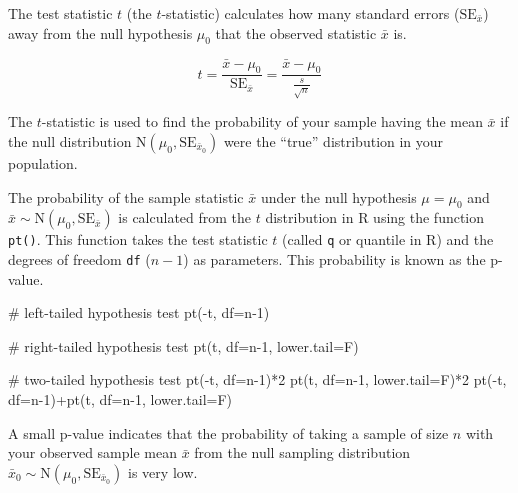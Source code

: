 \documentclass[
  letterpaper,
  DIV=11,
  numbers=noendperiod]{scrartcl}
\newenvironment{Shaded}{\begin{snugshade}}{\end{snugshade}}
\newcommand{\AttributeTok}[1]{\textcolor[rgb]{0.40,0.45,0.13}{#1}}
\newcommand{\CommentTok}[1]{\textcolor[rgb]{0.37,0.37,0.37}{#1}}
\newcommand{\DecValTok}[1]{\textcolor[rgb]{0.68,0.00,0.00}{#1}}
\newcommand{\FunctionTok}[1]{\textcolor[rgb]{0.28,0.35,0.67}{#1}}
\newcommand{\NormalTok}[1]{\textcolor[rgb]{0.00,0.23,0.31}{#1}}
\newcommand{\SpecialCharTok}[1]{\textcolor[rgb]{0.37,0.37,0.37}{#1}}
\begin{document}
The test statistic \(t\) (the \(t\)-statistic) calculates how many
standard errors (\(\text{SE}_{\bar{x}}\)) away from the null hypothesis
\(\mu_0\) that the observed statistic \(\bar{x}\) is.

\[
t=\frac{\bar{x}-\mu_0}{\text{SE}_{\bar{x}}}=\frac{\bar{x}-\mu_0}{\frac{s}{\sqrt{n}}}
\]

The \(t\)-statistic is used to find the probability of your sample
having the mean \(\bar{x}\) if the null distribution
\(\text{N}\left(\mu_0, \text{SE}_{\bar{x}_0}\right)\) were the ``true''
distribution in your population.

The probability of the sample statistic \(\bar{x}\) under the null
hypothesis \(\mu=\mu_0\) and
\(\bar{x} \sim \text{N}\left(\mu_0, \text{SE}_{\bar{x}}\right)\) is
calculated from the \(t\) distribution in R using the function
\texttt{pt()}. This function takes the test statistic \(t\) (called
\texttt{q} or quantile in R) and the degrees of freedom \texttt{df}
(\(n-1\)) as parameters. This probability is known as the p-value.

\begin{Shaded}
\begin{Highlighting}[]
\CommentTok{\# left{-}tailed hypothesis test}
\FunctionTok{pt}\NormalTok{(}\SpecialCharTok{{-}}\NormalTok{t, }\AttributeTok{df=}\NormalTok{n}\DecValTok{{-}1}\NormalTok{)}

\CommentTok{\# right{-}tailed hypothesis test}
\FunctionTok{pt}\NormalTok{(t, }\AttributeTok{df=}\NormalTok{n}\DecValTok{{-}1}\NormalTok{, }\AttributeTok{lower.tail=}\NormalTok{F)}

\CommentTok{\# two{-}tailed hypothesis test}
\FunctionTok{pt}\NormalTok{(}\SpecialCharTok{{-}}\NormalTok{t, }\AttributeTok{df=}\NormalTok{n}\DecValTok{{-}1}\NormalTok{)}\SpecialCharTok{*}\DecValTok{2}
\FunctionTok{pt}\NormalTok{(t, }\AttributeTok{df=}\NormalTok{n}\DecValTok{{-}1}\NormalTok{, }\AttributeTok{lower.tail=}\NormalTok{F)}\SpecialCharTok{*}\DecValTok{2}
\FunctionTok{pt}\NormalTok{(}\SpecialCharTok{{-}}\NormalTok{t, }\AttributeTok{df=}\NormalTok{n}\DecValTok{{-}1}\NormalTok{)}\SpecialCharTok{+}\FunctionTok{pt}\NormalTok{(t, }\AttributeTok{df=}\NormalTok{n}\DecValTok{{-}1}\NormalTok{, }\AttributeTok{lower.tail=}\NormalTok{F)}
\end{Highlighting}
\end{Shaded}

A small p-value indicates that the probability of taking a sample of
size \(n\) with your observed sample mean \(\bar{x}\) from the null
sampling distribution
\(\bar{x}_0 \sim \text{N}\left(\mu_0, \text{SE}_{\bar{x}_0}\right)\) is
very low.
\end{document}
